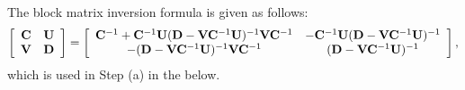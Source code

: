 \documentclass[11pt, draft, onecolumn ]{IEEEtran}
\begin{document}
The block matrix inversion formula is given as follows:
       \begin{equation}
            \left[
              \begin{array}{cc}
                {\bf C} & {\bf U} \\
                {\bf V} & {\bf D} \\
              \end{array}
            \right] = \left[
              \begin{array}{cc}
                {\bf C}^{-1} + {\bf C}^{-1} {\bf U} ({\bf D} - {\bf V} {\bf C}^{-1} {\bf U} )^{-1}{\bf V} {\bf C}^{-1}  &  -{\bf C}^{-1}{\bf U}({\bf D} - {\bf V} {\bf C}^{-1}{\bf U})^{-1} \\
                -({\bf D} - {\bf V} {\bf C}^{-1} {\bf U})^{-1} {\bf V} {\bf C}^{-1} & ({\bf D} - {\bf V} {\bf C}^{-1} {\bf U})^{-1} \\
              \end{array}
            \right],
        \end{equation}
        which is used in Step (a) in the below.
\end{document}
